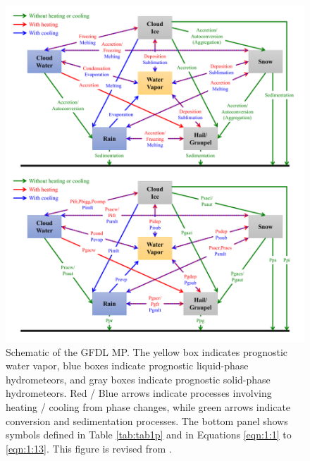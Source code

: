 \documentclass[letterpaper,titlepage,10pt]{article}
\numberwithin{equation}{section}
\begin{document}
\begin{figure}[!h]
\centering
\includegraphics[width=\textwidth]{fig1.pdf}
\caption{Schematic of the GFDL MP. The yellow box indicates prognostic water vapor, blue boxes indicate prognostic liquid-phase hydrometeors, and gray boxes indicate prognostic solid-phase hydrometeors. Red / Blue arrows indicate processes involving heating / cooling from phase changes, while green arrows indicate conversion and sedimentation processes. The bottom panel shows symbols defined in Table \ref{tab:tab1p} and in Equations \eqref{eqn:1:1} to \eqref{eqn:1:13}. This figure is revised from \citet{zhou2019towa}.}
\label{fig:fig1}
\end{figure}
\end{document}
